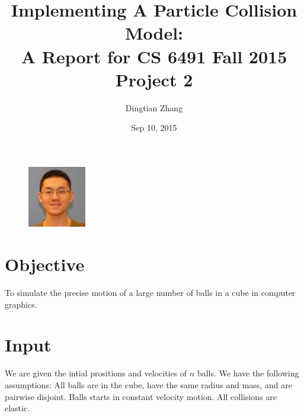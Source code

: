 \documentclass[twoside,11pt]{article}
\begin{document}
\title{Implementing A Particle Collision Model: \\ \large A Report for CS 6491 Fall 2015 Project 2}
\author{Dingtian Zhang}
\date{Sep 10, 2015}
\maketitle
\begin{figure} [H]
    \centering
    \includegraphics[width=1.0in]{pic_alan}
\end{figure}




\section{Objective}

To simulate the precise motion of a large number of balls in a cube in computer graphics. 

\section{Input}
We are given the intial prositions and velocities of $n$ balls. We have the following assumptions: All balls are in the cube, have the same radius and mass, and are pairwise disjoint. Balls starts in constant velocity motion. All collisions are elastic.
\end{document}
